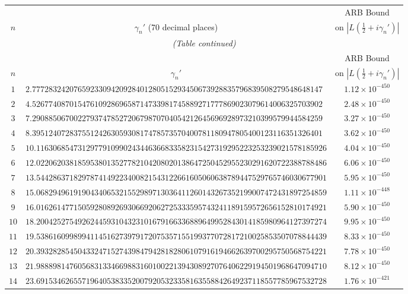 \documentclass[12pt,reqno]{amsart}
\theoremstyle{remark}
\begin{document}
\begin{longtable}{clc}
\toprule
 & & ARB Bound \\
$n$ & \multicolumn{1}{c}{$\gamma_n'$ (70 decimal places)} & on $|L(\tfrac{1}{2}+i\gamma_n')|$ \\
\midrule
\endfirsthead
\multicolumn{3}{c}{\small\itshape (Table continued)} \\
\toprule
 & & ARB Bound \\
$n$ & \multicolumn{1}{c}{$\gamma_n'$} & on $|L(\tfrac{1}{2}+i\gamma_n')|$ \\
\midrule
\endhead
\bottomrule
\endlastfoot
$1$ & $2.7772832420765923309420928401280515293450673928835796839508279548648147$ & $1.12\times 10^{-450}$ \\
$2$ & $4.5267740870154761092869658714733981745889271777869023079614006325703902$ & $2.48\times 10^{-450}$ \\
$3$ & $7.2908850670022793747852720679870704054212645696928973210399579944584259$ & $3.27\times 10^{-450}$ \\
$4$ & $8.3951240728375512426305930817478573570400781180947805400123116351326401$ & $3.62\times 10^{-450}$ \\
$5$ & $10.1163068547312977910990243446366833582315427319295223253239021578185926$ & $4.04\times 10^{-450}$ \\
$6$ & $12.0220620381859538013527782104208020138647250452955230291620722388788486$ & $6.06\times 10^{-450}$ \\
$7$ & $13.5442863718297874149223400821543122661605060638789447529765746030677901$ & $5.95\times 10^{-450}$ \\
$8$ & $15.0682949619190434065321552989713036411260143267352199007472431897254859$ & $1.11\times 10^{-448}$ \\
$9$ & $16.0162614771505928089269306692062725333595743241189159572656152810174921$ & $5.90\times 10^{-450}$ \\
$10$ & $18.2004252754926244593104323101679166336889649952843014185980964127397274$ & $9.95\times 10^{-450}$ \\
$11$ & $19.5386160998994114516273979172075357155199377072817210025853507078844439$ & $8.33\times 10^{-450}$ \\
$12$ & $20.3932828545043324715274398479428182806107916194662639700295750568754221$ & $7.78\times 10^{-450}$ \\
$13$ & $21.9888981476056831334669883160100221394308927076406229194501968647094710$ & $8.12\times 10^{-450}$ \\
$14$ & $23.6915346265571964053833520079205323358163558842649237118557785967532728$ & $1.76\times 10^{-421}$ \\

\end{longtable}
\end{document}
